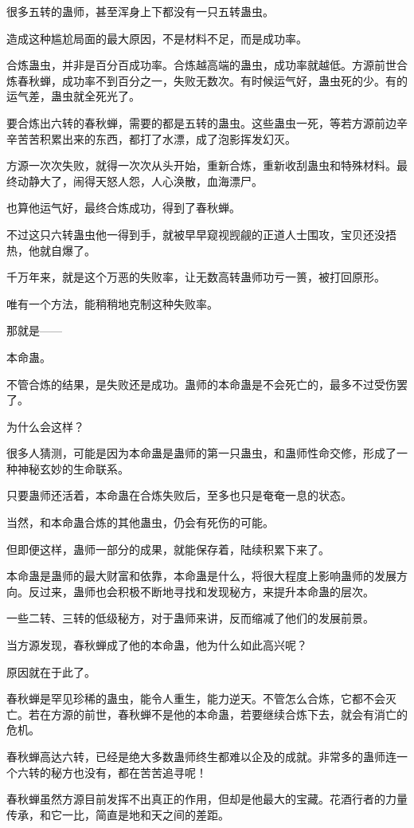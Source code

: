 \begin{this_body}
很多五转的蛊师，甚至浑身上下都没有一只五转蛊虫。

造成这种尴尬局面的最大原因，不是材料不足，而是成功率。

合炼蛊虫，并非是百分百成功率。合炼越高端的蛊虫，成功率就越低。方源前世合炼春秋蝉，成功率不到百分之一，失败无数次。有时候运气好，蛊虫死的少。有的运气差，蛊虫就全死光了。

要合炼出六转的春秋蝉，需要的都是五转的蛊虫。这些蛊虫一死，等若方源前边辛辛苦苦积累出来的东西，都打了水漂，成了泡影挥发幻灭。

方源一次次失败，就得一次次从头开始，重新合炼，重新收刮蛊虫和特殊材料。最终动静大了，闹得天怒人怨，人心涣散，血海漂尸。

也算他运气好，最终合炼成功，得到了春秋蝉。

不过这只六转蛊虫他一得到手，就被早早窥视觊觎的正道人士围攻，宝贝还没捂热，他就自爆了。

千万年来，就是这个万恶的失败率，让无数高转蛊师功亏一篑，被打回原形。

唯有一个方法，能稍稍地克制这种失败率。

那就是——

本命蛊。

不管合炼的结果，是失败还是成功。蛊师的本命蛊是不会死亡的，最多不过受伤罢了。

为什么会这样？

很多人猜测，可能是因为本命蛊是蛊师的第一只蛊虫，和蛊师性命交修，形成了一种神秘玄妙的生命联系。

只要蛊师还活着，本命蛊在合炼失败后，至多也只是奄奄一息的状态。

当然，和本命蛊合炼的其他蛊虫，仍会有死伤的可能。

但即便这样，蛊师一部分的成果，就能保存着，陆续积累下来了。

本命蛊是蛊师的最大财富和依靠，本命蛊是什么，将很大程度上影响蛊师的发展方向。反过来，蛊师也会积极不断地寻找和发现秘方，来提升本命蛊的层次。

一些二转、三转的低级秘方，对于蛊师来讲，反而缩减了他们的发展前景。

当方源发现，春秋蝉成了他的本命蛊，他为什么如此高兴呢？

原因就在于此了。

春秋蝉是罕见珍稀的蛊虫，能令人重生，能力逆天。不管怎么合炼，它都不会灭亡。若在方源的前世，春秋蝉不是他的本命蛊，若要继续合炼下去，就会有消亡的危机。

春秋蝉高达六转，已经是绝大多数蛊师终生都难以企及的成就。非常多的蛊师连一个六转的秘方也没有，都在苦苦追寻呢！

春秋蝉虽然方源目前发挥不出真正的作用，但却是他最大的宝藏。花酒行者的力量传承，和它一比，简直是地和天之间的差距。

\end{this_body}

